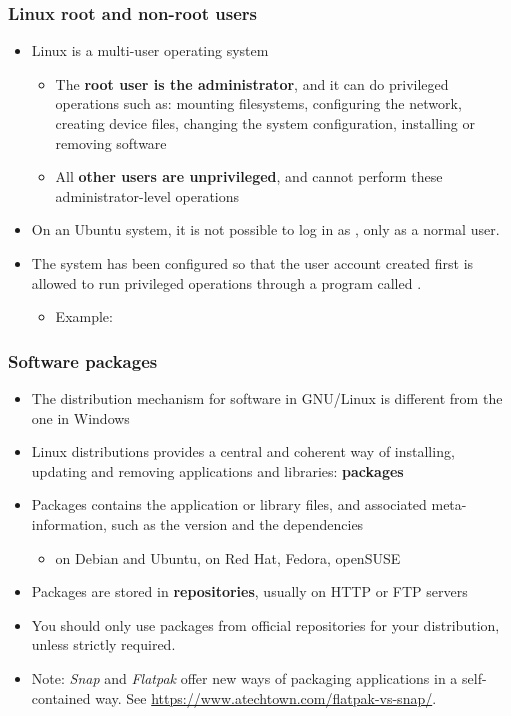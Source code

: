 \begin{frame}
  \frametitle{Linux root and non-root users}
  \begin{itemize}
  \item Linux is a multi-user operating system
    \begin{itemize}
    \item The {\bf root user is the administrator}, and it can do
      privileged operations such as: mounting filesystems, configuring
      the network, creating device files, changing the system
      configuration, installing or removing software
    \item All {\bf other users are unprivileged}, and cannot perform
      these administrator-level operations
    \end{itemize}
  \item On an Ubuntu system, it is not possible to log in as
    , only as a normal user.
  \item The system has been configured so that the user account
    created first is allowed to run privileged operations through a
    program called .\\
    \begin{itemize}
    \item Example: 
    \end{itemize}
  \end{itemize}
\end{frame}

\begin{frame}
  \frametitle{Software packages}
  \begin{itemize}
  \item The distribution mechanism for software in GNU/Linux is
    different from the one in Windows
  \item Linux distributions provides a central and coherent way of
    installing, updating and removing applications and libraries:
    {\bf packages}
  \item Packages contains the application or library files, and
    associated meta-information, such as the version and the
    dependencies
    \begin{itemize}
    \item {} on Debian and Ubuntu,  on Red Hat,
      Fedora, openSUSE
    \end{itemize}
  \item Packages are stored in {\bf repositories}, usually on HTTP or
    FTP servers
  \item You should only use packages from official repositories for your
    distribution, unless strictly required.
  \item Note: {\em Snap} and {\em Flatpak} offer new ways of packaging
    applications in a self-contained way. See
    \url{https://www.atechtown.com/flatpak-vs-snap/}.

\end{itemize}
\end{frame}

